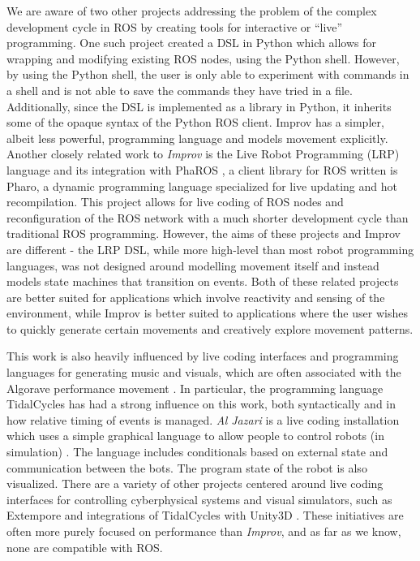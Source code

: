 \documentclass[sigchi-a]{acmart}
\begin{document}
We are aware of two other projects addressing the problem of the complex
development cycle in ROS by creating tools for interactive or ``live''
programming. One such project \cite{python_live_DSLRob} created a DSL in Python
which allows for wrapping and modifying existing ROS nodes, using the Python
shell. However, by using the Python shell, the user is only able to experiment
with commands in a shell and is not able to save the commands they have tried in
a file. Additionally, since the DSL is implemented as a library in Python, it
inherits some of the opaque syntax of the Python ROS client. Improv has a
simpler, albeit less powerful, programming language and models movement
explicitly. Another closely related work to \emph{Improv} is the Live Robot
Programming (LRP) language \cite{campusano2017live} and its integration with PhaROS
\cite{estefo2014towards}, a client library for ROS written is Pharo, a dynamic
programming language specialized for live updating and hot recompilation. This
project allows for live coding of ROS nodes and reconfiguration of the ROS
network with a much shorter development cycle than traditional ROS programming.
However, the aims of these projects and Improv are different - the LRP DSL,
while more high-level than most robot programming languages, was not designed
around modelling movement itself and instead models state machines that
transition on events. Both of these related projects are better suited for
applications which involve reactivity and sensing of the environment, while
Improv is better suited to applications where the user wishes to quickly
generate certain movements and creatively explore movement patterns.

This work is also heavily influenced by live coding interfaces and programming
languages for generating music and visuals, which are often associated with the
Algorave performance movement \cite{collins2014algorave}. In particular, the
programming language TidalCycles \cite{mclean2010tidal} has had a strong
influence on this work, both syntactically and in how relative timing of events
is managed. \emph{Al Jazari} is a live coding installation which uses a simple
graphical language to allow people to control robots (in simulation)
\cite{mclean2010visualisation}. The language includes conditionals based on
external state and communication between the bots. The program state of the
robot is also visualized. There are a variety of other projects centered around
live coding interfaces for controlling cyberphysical systems and visual
simulators, such as Extempore and integrations of TidalCycles with Unity3D
\cite{livecoding14}. These initiatives are often more purely focused on
performance than \emph{Improv}, and as far as we know, none are compatible with
ROS.
\end{document}
